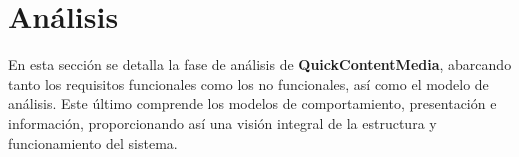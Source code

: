 \chapter{Análisis}
En esta sección se detalla la fase de análisis de \textbf{QuickContentMedia}, abarcando tanto los requisitos funcionales como los no funcionales, así como el modelo de análisis. Este último comprende los modelos de comportamiento, presentación e información, proporcionando así una visión integral de la estructura y funcionamiento del sistema.



\newpage

\newpage
